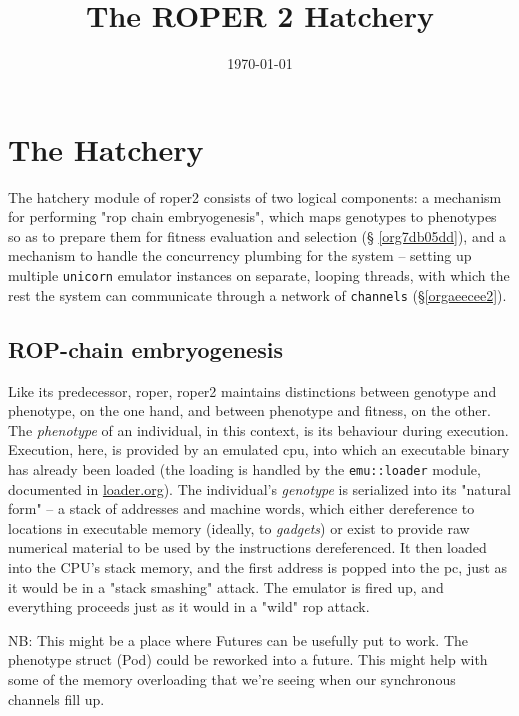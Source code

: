 \documentclass[11pt]{article}
\date{\today}
\title{The ROPER 2 Hatchery}
\begin{document}
\maketitle
\tableofcontents


\section{The Hatchery}
\label{sec:orgfe2a743}

The hatchery module of \gls{roper2} consists of two logical components: a
mechanism for performing "\gls{rop} chain embryogenesis", which maps genotypes to
phenotypes so as to prepare them for fitness evaluation and selection (\S
\ref{org7db05dd}), and a mechanism to handle the concurrency plumbing for the
system -- setting up multiple \texttt{unicorn} emulator instances on separate, looping
threads, with which the rest the system can communicate through a network of
\texttt{channels} (\S \ref{orgaeecee2}). 

\subsection{ROP-chain embryogenesis}
\label{sec:org35078e3}
\label{org7db05dd}

Like its predecessor, \gls{roper}, \gls{roper2} maintains distinctions between
genotype and phenotype, on the one hand, and between phenotype and fitness,
on the other. The \emph{phenotype} of an individual, in this context, is its
behaviour during execution. Execution, here, is provided by an emulated
\gls{cpu}, into which an executable binary has already been loaded (the
loading is handled by the \texttt{emu::loader} module, documented in \url{loader.org}).
The individual's \emph{genotype} is serialized into its "natural form" -- a
stack of addresses and machine words, which either dereference to locations
in executable memory (ideally, to \emph{gadgets}) or exist to provide raw numerical
material to be used by the instructions dereferenced. It then loaded into
the CPU's stack memory, and the first address is popped into the \gls{pc}, 
just as it would be in a "stack smashing" attack. The emulator is fired up,
and everything proceeds just as it would in a "wild" \gls{rop} attack.  

NB: This might be a place where Futures can be usefully put to work. 
The phenotype struct (Pod) could be reworked into a future. This might
help with some of the memory overloading that we're seeing when our
synchronous channels fill up. 
\end{document}
